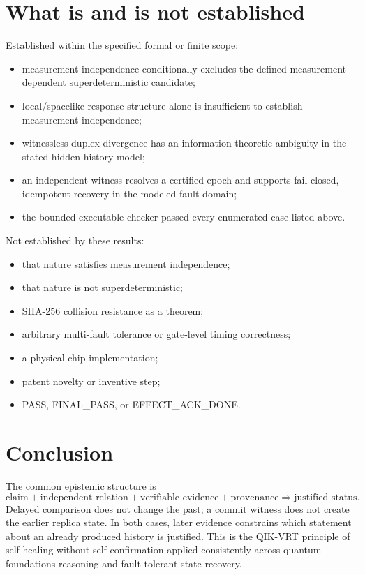 \documentclass[11pt,a4paper]{article}
\begin{document}
\section{What is and is not established}
Established within the specified formal or finite scope:
\begin{itemize}[leftmargin=*]
\item measurement independence conditionally excludes the defined measurement-dependent superdeterministic candidate;
\item local/spacelike response structure alone is insufficient to establish measurement independence;
\item witnessless duplex divergence has an information-theoretic ambiguity in the stated hidden-history model;
\item an independent witness resolves a certified epoch and supports fail-closed, idempotent recovery in the modeled fault domain;
\item the bounded executable checker passed every enumerated case listed above.
\end{itemize}
Not established by these results:
\begin{itemize}[leftmargin=*]
\item that nature satisfies measurement independence;
\item that nature is not superdeterministic;
\item SHA-256 collision resistance as a theorem;
\item arbitrary multi-fault tolerance or gate-level timing correctness;
\item a physical chip implementation;
\item patent novelty or inventive step;
\item PASS, FINAL\_PASS, or EFFECT\_ACK\_DONE.
\end{itemize}

\section{Conclusion}
The common epistemic structure is
\[
\boxed{\text{claim}+\text{independent relation}+\text{verifiable evidence}+\text{provenance}\Rightarrow\text{justified status}}.
\]
Delayed comparison does not change the past; a commit witness does not create the earlier replica state. In both cases, later evidence constrains which statement about an already produced history is justified. This is the QIK-VRT principle of self-healing without self-confirmation applied consistently across quantum-foundations reasoning and fault-tolerant state recovery.
\end{document}
